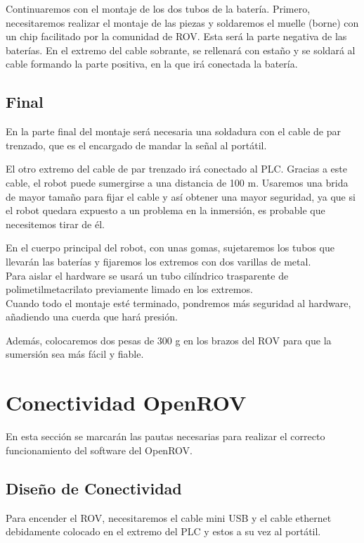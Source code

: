 Continuaremos con el montaje de los dos tubos de la batería. Primero, necesitaremos realizar el montaje de las piezas y soldaremos el muelle (borne) con un chip facilitado por la comunidad de ROV. Esta será la parte negativa de las baterías.
En el extremo del cable sobrante, se rellenará con estaño y se soldará al cable formando la parte positiva, en la que irá conectada la batería.

\subsection{Final}
\label{subsec:final}

En la parte final del montaje será necesaria una soldadura con el cable de par trenzado, que es el encargado de mandar la señal al portátil.

El otro extremo del cable de par trenzado irá conectado al PLC. Gracias a este cable, el robot puede sumergirse a una distancia de 100 m. Usaremos una brida de mayor tamaño para fijar el cable y así obtener una mayor seguridad, ya que si el robot quedara expuesto a un problema en la inmersión, es probable que necesitemos tirar de él.

En el cuerpo principal del robot, con unas gomas, sujetaremos los tubos que llevarán las baterías y fijaremos los extremos con dos varillas de metal.
\\Para aislar el hardware se usará un tubo cilíndrico trasparente de polimetilmetacrilato previamente limado en los extremos.
\\Cuando todo el montaje esté terminado, pondremos más seguridad al hardware, añadiendo una cuerda que hará presión.

Además, colocaremos dos pesas de 300 g en los brazos del ROV para que la sumersión sea más fácil y fiable.

\section{Conectividad OpenROV}
\label{cap:Conectividad OpenROV}
  
En esta sección se marcarán las pautas necesarias para realizar el correcto funcionamiento del software del OpenROV.  
  
\subsection{Diseño de Conectividad}
\label{subsec:disenio}

Para encender el ROV, necesitaremos el cable mini USB y el cable ethernet debidamente colocado en el extremo del PLC y estos a su vez al portátil.

